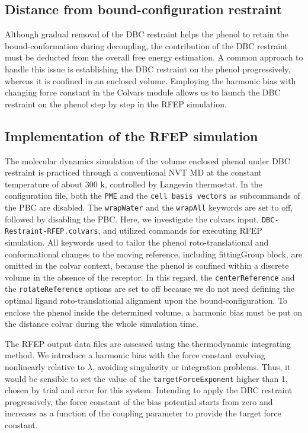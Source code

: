 \documentclass[9pt,tutorial]{livecoms}
\begin{document}
\subsection{Distance from bound-configuration restraint}
Although gradual removal of the DBC restraint helps the phenol to retain the bound-conformation during decoupling, the contribution of the DBC restraint must be deducted from the overall free energy estimation. A common approach to handle this issue is establishing the DBC restraint on the phenol progressively, whereas it is confined in an enclosed volume. Employing the harmonic bias with changing force constant in the Colvars module allows us to launch the DBC restraint on the phenol step by step in the RFEP simulation.

\subsection{Implementation of the RFEP simulation}\label{section 8.2}
The molecular dynamics simulation of the volume enclosed phenol under DBC restraint is practiced through a conventional NVT MD at the constant temperature of about 300 k, controlled by Langevin thermostat. In the configuration file, both the \texttt{PME} and the \texttt{cell basis vectors} as subcommands of the PBC are disabled. The \texttt{wrapWater} and the \texttt{wrapAll} keywords are set to off, followed by disabling the PBC. Here, we investigate the colvars input, \texttt{DBC-Restraint-RFEP.colvars}, and utilized commands for executing RFEP simulation. All keywords used to tailor the phenol roto-translational and conformational changes to the moving reference, including fittingGroup block, are omitted in the colvar context, because the phenol is confined within a discrete volume in the absence of the receptor. In this regard, the \texttt{centerReference} and the \texttt{rotateReference} options are set to off because we do not need defining the optimal ligand roto-translational alignment upon the bound-configuration. To enclose the phenol inside the determined volume, a harmonic bias must be put on the distance colvar during the whole simulation time.

The RFEP output data files are assessed using the thermodynamic integrating method. We introduce a harmonic bias with the force constant evolving nonlinearly relative to {$\lambda$}, avoiding singularity or integration problems. Thus, it would be sensible to set the value of the \texttt{targetForceExponent} higher than 1, chosen by trial and error for this system. Intending to apply the DBC restraint progressively, the force constant of the bias potential starts from zero and increases as a function of the coupling parameter to provide the target force constant.
\end{document}
